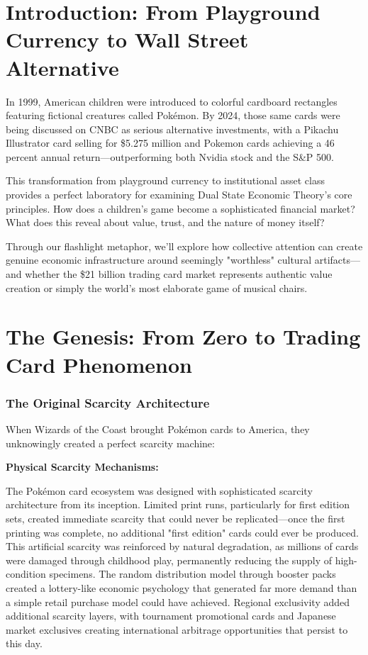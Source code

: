 \documentclass[11pt,oneside]{book}
\begin{document}
{{{{{{\section{Introduction: From Playground Currency to Wall Street Alternative}

In 1999, American children were introduced to colorful cardboard rectangles featuring fictional creatures called Pokémon. By 2024, those same cards were being discussed on CNBC as serious alternative investments, with a Pikachu Illustrator card selling for \$5.275 million and Pokemon cards achieving a 46 percent annual return—outperforming both Nvidia stock and the S\&P 500.

This transformation from playground currency to institutional asset class provides a perfect laboratory for examining Dual State Economic Theory's core principles. How does a children's game become a sophisticated financial market? What does this reveal about value, trust, and the nature of money itself?

Through our flashlight metaphor, we'll explore how collective attention can create genuine economic infrastructure around seemingly "worthless" cultural artifacts—and whether the \$21 billion trading card market represents authentic value creation or simply the world's most elaborate game of musical chairs.

\section{The Genesis: From Zero to Trading Card Phenomenon}

\subsubsection{The Original Scarcity Architecture}

When Wizards of the Coast brought Pokémon cards to America, they unknowingly created a perfect scarcity machine:

\textbf{Physical Scarcity Mechanisms:}

The Pokémon card ecosystem was designed with sophisticated scarcity architecture from its inception. Limited print runs, particularly for first edition sets, created immediate scarcity that could never be replicated—once the first printing was complete, no additional "first edition" cards could ever be produced. This artificial scarcity was reinforced by natural degradation, as millions of cards were damaged through childhood play, permanently reducing the supply of high-condition specimens. The random distribution model through booster packs created a lottery-like economic psychology that generated far more demand than a simple retail purchase model could have achieved. Regional exclusivity added additional scarcity layers, with tournament promotional cards and Japanese market exclusives creating international arbitrage opportunities that persist to this day.

}}}}}}
\end{document}
